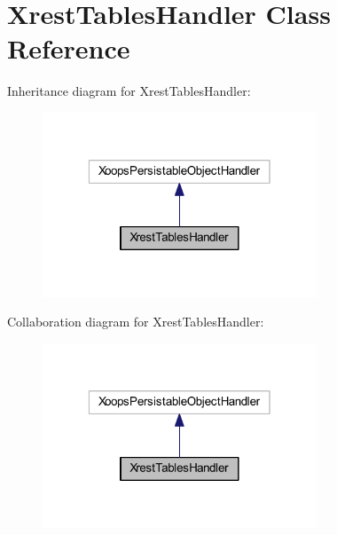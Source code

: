 \hypertarget{class_xrest_tables_handler}{\section{Xrest\-Tables\-Handler Class Reference}
\label{class_xrest_tables_handler}
}


Inheritance diagram for Xrest\-Tables\-Handler\-:
\nopagebreak
\begin{figure}[H]
\begin{center}
\leavevmode
\includegraphics[width=232pt]{class_xrest_tables_handler__inherit__graph}
\end{center}
\end{figure}


Collaboration diagram for Xrest\-Tables\-Handler\-:
\nopagebreak
\begin{figure}[H]
\begin{center}
\leavevmode
\includegraphics[width=232pt]{class_xrest_tables_handler__coll__graph}
\end{center}
\end{figure}
